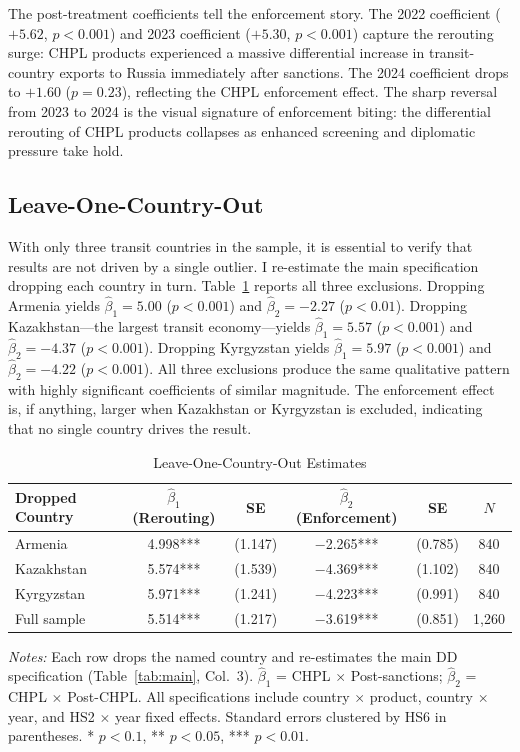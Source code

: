 \documentclass[12pt]{article}
\begin{document}
The post-treatment coefficients tell the enforcement story. The 2022 coefficient ($+5.62$, $p < 0.001$) and 2023 coefficient ($+5.30$, $p < 0.001$) capture the rerouting surge: CHPL products experienced a massive differential increase in transit-country exports to Russia immediately after sanctions. The 2024 coefficient drops to $+1.60$ ($p = 0.23$), reflecting the CHPL enforcement effect. The sharp reversal from 2023 to 2024 is the visual signature of enforcement biting: the differential rerouting of CHPL products collapses as enhanced screening and diplomatic pressure take hold.

\subsection{Leave-One-Country-Out}

With only three transit countries in the sample, it is essential to verify that results are not driven by a single outlier. I re-estimate the main specification dropping each country in turn. Table~\ref{tab:loo} reports all three exclusions. Dropping Armenia yields $\hat{\beta}_1 = 5.00$ ($p < 0.001$) and $\hat{\beta}_2 = -2.27$ ($p < 0.01$). Dropping Kazakhstan---the largest transit economy---yields $\hat{\beta}_1 = 5.57$ ($p < 0.001$) and $\hat{\beta}_2 = -4.37$ ($p < 0.001$). Dropping Kyrgyzstan yields $\hat{\beta}_1 = 5.97$ ($p < 0.001$) and $\hat{\beta}_2 = -4.22$ ($p < 0.001$). All three exclusions produce the same qualitative pattern with highly significant coefficients of similar magnitude. The enforcement effect is, if anything, larger when Kazakhstan or Kyrgyzstan is excluded, indicating that no single country drives the result.

\begin{table}[H]
\centering
\small
\caption{Leave-One-Country-Out Estimates}
\label{tab:loo}
\begin{tabular}{lccccc}
\toprule
Dropped Country & $\hat{\beta}_1$ (Rerouting) & SE & $\hat{\beta}_2$ (Enforcement) & SE & $N$ \\
\midrule
Armenia & 4.998*** & (1.147) & $-$2.265*** & (0.785) & 840 \\
Kazakhstan & 5.574*** & (1.539) & $-$4.369*** & (1.102) & 840 \\
Kyrgyzstan & 5.971*** & (1.241) & $-$4.223*** & (0.991) & 840 \\
\midrule
Full sample & 5.514*** & (1.217) & $-$3.619*** & (0.851) & 1,260 \\
\bottomrule
\end{tabular}
\par\vspace{0.3em}
{\footnotesize \emph{Notes:} Each row drops the named country and re-estimates the main DD specification (Table~\ref{tab:main}, Col.\ 3). $\hat{\beta}_1$ = CHPL $\times$ Post-sanctions; $\hat{\beta}_2$ = CHPL $\times$ Post-CHPL. All specifications include country $\times$ product, country $\times$ year, and HS2 $\times$ year fixed effects. Standard errors clustered by HS6 in parentheses. * $p < 0.1$, ** $p < 0.05$, *** $p < 0.01$.}
\end{table}
\end{document}

